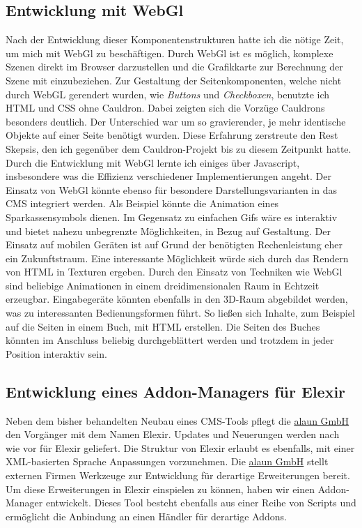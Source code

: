 \documentclass[12pt]{article}
\begin{document}
\subsection{Entwicklung mit WebGl}

Nach der Entwicklung dieser Komponentenstrukturen hatte ich die nötige Zeit, um mich mit WebGl zu beschäftigen. Durch WebGl ist es möglich,
komplexe Szenen direkt im Browser darzustellen und die Grafikkarte zur Berechnung der Szene mit einzubeziehen.
Zur Gestaltung der Seitenkomponenten, welche nicht durch WebGL gerendert wurden, wie \textit{Buttons}
und \textit{Checkboxen}, benutzte ich HTML und CSS ohne Cauldron. Dabei zeigten sich die Vorzüge Cauldrons besonders deutlich.
Der Unterschied war um so gravierender, je mehr identische Objekte auf einer Seite benötigt wurden. Diese Erfahrung zerstreute den Rest Skepsis,
den ich gegenüber dem Cauldron-Projekt bis zu diesem Zeitpunkt hatte. Durch die Entwicklung mit WebGl lernte ich einiges über Javascript,
insbesondere was die Effizienz verschiedener Implementierungen angeht. Der Einsatz von WebGl könnte ebenso für besondere Darstellungsvarianten
in das CMS integriert werden. Als Beispiel könnte die Animation eines Sparkassensymbols dienen. Im Gegensatz zu einfachen Gifs wäre es interaktiv
und bietet nahezu unbegrenzte Möglichkeiten, in Bezug auf Gestaltung. Der Einsatz auf mobilen Geräten ist auf Grund der benötigten Rechenleistung eher ein
Zukunftstraum. Eine interessante Möglichkeit würde sich durch das Rendern von HTML in Texturen ergeben. Durch den Einsatz von Techniken wie WebGl sind beliebige Animationen in einem dreidimensionalen Raum in Echtzeit erzeugbar. 
Eingabegeräte könnten ebenfalls in den 3D-Raum abgebildet werden, was zu interessanten Bedienungsformen führt.
So ließen sich Inhalte, zum Beispiel auf die Seiten in einem Buch, mit HTML erstellen. Die Seiten des Buches könnten im Anschluss
beliebig durchgeblättert werden und trotzdem in jeder Position interaktiv sein.

\subsection{Entwicklung eines Addon-Managers für Elexir}

Neben dem bisher behandelten Neubau eines CMS-Tools pflegt die \href{https://alaun.de/home/}{alaun GmbH} den Vorgänger mit dem Namen Elexir.
Updates und Neuerungen werden nach wie vor für Elexir geliefert. 
Die Struktur von Elexir erlaubt es ebenfalls, mit einer XML-basierten Sprache Anpassungen vorzunehmen. 
Die \href{https://alaun.de/home/}{alaun GmbH} stellt externen Firmen Werkzeuge zur Entwicklung für derartige
Erweiterungen bereit. Um diese Erweiterungen in Elexir einspielen zu können, haben wir einen Addon-Manager entwickelt. 
Dieses Tool besteht ebenfalls aus einer Reihe von Scripts und ermöglicht die Anbindung an einen Händler für derartige Addons.
\end{document}
